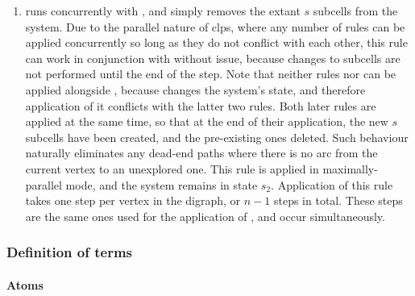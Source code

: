 \begin{enumerate}
    \item {} runs concurrently with , and simply removes the extant \(s\) subcells from the system.  Due to the parallel nature of \gls{clps}, where any number of rules can be applied concurrently so long as they do not conflict with each other, this rule can work in conjunction with  without issue, because changes to subcells are not performed until the end of the step.  Note that neither rules  nor  can be applied alongside , because  changes the system's state, and therefore application of it conflicts with the latter two rules.  Both later rules are applied at the same time, so that at the end of their application, the new \(s\) subcells have been created, and the pre-existing ones deleted.  Such behaviour naturally eliminates any dead-end paths where there is no arc from the current vertex to an unexplored one.  This rule is applied in maximally-parallel mode, and the system remains in state \(s_2\).  Application of this rule takes one step per vertex in the digraph, or \(n - 1\) steps in total.  These steps are the same ones used for the application of , and occur simultaneously.
\end{enumerate}

\subsubsection{\label{sec:tsp:hppterms}Definition of terms}

\paragraph{Atoms}
\begin{description}
\end{description}

